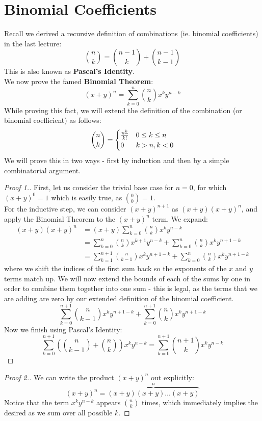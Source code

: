 \documentclass[11pt,twosided]{article}
\begin{document}
\section{Binomial Coefficients}
Recall we derived a recursive definition of combinations (ie. binomial coefficients) in the last lecture: 
\[
	\binom{n}{k} = \binom{n-1}{k} + \binom{n-1}{k-1}
\]
This is also known as \textbf{Pascal's Identity}.\\
We now prove the famed \textbf{Binomial Theorem}: 
\[
	(x+y)^n = \sum_{k=0}^n \binom{n}{k} x^k y^{n-k}
\]
While proving this fact, we will extend the definition of the combination (or binomial coefficient) as follows:
\[
	\binom{n}{k} = \begin{cases} 
      \frac{{n}^{\underline{k}}}{k!} & 0 \leq k \leq n \\
      0 & k > n, k < 0
   \end{cases}
\]
We will prove this in two ways - first by induction and then by a simple combinatorial argument. 
\begin{proof}[Proof 1.]
	First, let us consider the trivial base case for $n=0$, for which $(x+y)^0 = 1$ which is easily true, as $\binom{0}{0} = 1$.  \\
	For the inductive step, we can consider $(x+y)^{n+1}$ as $(x+y)(x+y)^n$, and apply the Binomial Theorem to the $(x+y)^n$ term. We expand: 
\begin{align*}
(x+y)(x+y)^n &= (x+y) \sum_{k=0}^n \binom{n}{k} x^k y^{n-k} \\
&= \sum_{k=0}^n \binom{n}{k} x^{k+1} y^{n-k} + \sum_{k=0}^n \binom{n}{k} x^k y^{n+1-k} \\
&= \sum_{k=1}^{n+1} \binom{n}{k-1} x^{k} y^{n+1-k} + \sum_{k=0}^n \binom{n}{k} x^k y^{n+1-k} 
\end{align*}
where we shift the indices of the first sum back so the exponents of the $x$ and $y$ terms match up. We will now extend the bounds of each of the sums by one in order to combine them together into one sum - this is legal, as the terms that we are adding are zero by our extended definition of the binomial coefficient. 
\[
	\sum_{k=0}^{n+1} \binom{n}{k-1} x^{k} y^{n+1-k} + \sum_{k=0}^{n+1} \binom{n}{k} x^k y^{n+1-k} 
\]
Now we finish using Pascal's Identity:
\[
	\sum_{k=0}^{n+1} \left(\binom{n}{k-1} + \binom{n}{k}\right) x^{k} y^{n-k} = \sum_{k=0}^{n+1} \binom{n+1}{k} x^{k} y^{n-k} 
\]
\end{proof}
\begin{proof}[Proof 2.]
	We can write the product $(x+y)^n$ out explicitly:
\[
	(x+y)^n = \overbrace{(x+y)(x+y)\ldots (x+y)}^n
\]
Notice that the term $x^k y^{n-k}$ appears $\binom{n}{k}$ times, which immediately implies the desired as we sum over all possible $k$. 
\end{proof}
\end{document}
